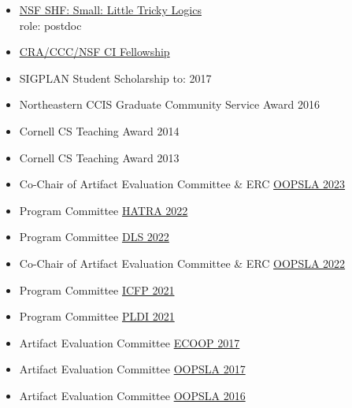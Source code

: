 \documentclass[11pt]{article}
\begin{document}
\begin{itemize}
  \item \href{https://www.nsf.gov/awardsearch/showAward?AWD_ID=2227863&HistoricalAwards=false}{NSF SHF: Small: Little Tricky Logics} \hfill {}
    \\ role: postdoc
  \item \href{https://cifellows2020.org}{CRA/CCC/NSF CI Fellowship} \hfill {}
  \item {SIGPLAN Student Scholarship to: \turing{}} \hfill 2017
  \item Northeastern CCIS Graduate Community Service Award \hfill 2016
  \item Cornell CS Teaching Award \hfill 2014
  \item Cornell CS Teaching Award \hfill 2013
\end{itemize}


\begin{itemize}
  \item {Co-Chair of Artifact Evaluation Committee \& ERC} \hfill \href{https://2023.splashcon.org}{OOPSLA 2023}
  \item {Program Committee} \hfill \href{https://2022.splashcon.org/home/hatra-2022}{HATRA 2022}
  \item {Program Committee} \hfill \href{https://2022.splashcon.org/track/dls-2022-papers}{DLS 2022}
  \item {Co-Chair of Artifact Evaluation Committee \& ERC} \hfill \href{https://2022.splashcon.org}{OOPSLA 2022}
  \item {Program Committee} \hfill \href{https://icfp21.sigplan.org/committee/icfp-2021-papers-program-committee}{ICFP 2021}
  \item {Program Committee} \hfill \href{https://pldi21.sigplan.org/committee/pldi-2021-papers-program-committee}{PLDI 2021}
  \item {Artifact Evaluation Committee} \hfill \href{https://2017.ecoop.org/track/ecoop-2017-Artifacts}{ECOOP 2017}
  \item {Artifact Evaluation Committee} \hfill \href{https://2017.splashcon.org/track/splash-2017-OOPSLA-Artifacts}{OOPSLA 2017}
  \item {Artifact Evaluation Committee} \hfill \href{http://2016.splashcon.org/track/splash-2016-artifacts}{OOPSLA 2016}
\end{itemize}
\end{document}
